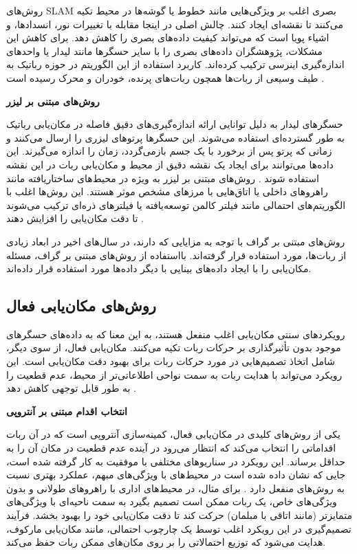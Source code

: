 روش‌های SLAM بصری اغلب بر ویژگی‌هایی مانند خطوط یا گوشه‌ها در محیط تکیه می‌کنند تا نقشه‌ای ایجاد کنند. چالش اصلی در اینجا مقابله با تغییرات نور، انسدادها، و اشیاء پویا است که می‌تواند کیفیت داده‌های بصری را کاهش دهد. برای کاهش این مشکلات، پژوهشگران داده‌های بصری را با سایر حسگرها مانند لیدار یا واحدهای اندازه‌گیری اینرسی ترکیب کرده‌اند. کاربرد استفاده از این الگوریتم در حوزه رباتیک به طیف وسیعی از ربات‌ها همچون ربات‌های پرنده، خودران و محرک رسیده است
\cite{guan2021robot, khairuddin2015review, choset2001topological}.

\textbf{روش‌های مبتنی بر لیزر}

حسگرهای لیدار به دلیل توانایی ارائه اندازه‌گیری‌های دقیق فاصله در مکان‌یابی رباتیک به طور گسترده‌ای استفاده می‌شوند. این حسگرها پرتوهای لیزری را ارسال می‌کنند و زمانی که پرتو پس از برخورد با یک جسم بازمی‌گردد، زمان را اندازه می‌گیرند. این داده‌ها می‌توانند برای ایجاد یک نقشه دقیق از محیط و مکان‌یابی ربات در این نقشه استفاده شوند
 \cite{xu2019indoor}. 
روش‌های مبتنی بر لیزر به ویژه در محیط‌های ساختاریافته مانند راهروهای داخلی یا اتاق‌هایی با مرزهای مشخص موثر هستند. این روش‌ها اغلب با الگوریتم‌های احتمالی مانند فیلتر کالمن توسعه‌یافته یا فیلترهای ذره‌ای ترکیب می‌شوند تا دقت مکان‌یابی را افزایش دهند
 \cite{liu2022improved, blok2019robot}.
 
 روش‌های مبتنی بر گراف با توجه به مزایایی که دارند، در سال‌های اخیر در ابعاد زیادی از ربات‌ها، مورد استفاده قرار گرفته‌اند. 
 \cite{yang2022indoor, song2021tightly, li2015gaussian, dai2022uav} بااستفاده از روش‌های مبتنی بر گراف، مسئله مکان‌یابی را با ایجاد داده‌های بینایی با دیگر داده‌ها مورد استفاده قرار داده‌اند.

\subsection{روش‌های مکان‌یابی فعال}

رویکردهای سنتی مکان‌یابی اغلب منفعل هستند، به این معنا که به داده‌های حسگرهای موجود بدون تأثیرگذاری بر حرکات ربات تکیه می‌کنند. مکان‌یابی فعال، از سوی دیگر، شامل اتخاذ تصمیم‌هایی در مورد حرکات ربات برای بهبود دقت مکان‌یابی است. این رویکرد می‌تواند با هدایت ربات به سمت نواحی اطلاعاتی‌تر از محیط، عدم قطعیت را به طور قابل توجهی کاهش دهد
\cite{burgard1997active}.

\textbf{انتخاب اقدام مبتنی بر آنتروپی}

یکی از روش‌های کلیدی در مکان‌یابی فعال، کمینه‌سازی آنتروپی است که در آن ربات اقداماتی را انتخاب می‌کند که انتظار می‌رود در آینده عدم قطعیت در مکان آن را به حداقل برساند. این رویکرد در سناریوهای مختلفی با موفقیت به کار گرفته شده است، جایی که نشان داده شده است در محیط‌های با ویژگی‌های مبهم، عملکرد بهتری نسبت به روش‌های منفعل دارد
\cite{burgard1997active2}.
برای مثال، در محیط‌های اداری با راهروهای طولانی و بدون ویژگی‌های خاص، یک ربات ممکن است تصمیم بگیرد به سمت ناحیه‌ای با ویژگی‌های متمایزتر (مانند اتاقی با مبلمان) حرکت کند تا دقت مکان‌یابی خود را بهبود بخشد. فرآیند تصمیم‌گیری در این رویکرد اغلب توسط یک چارچوب احتمالی، مانند مکان‌یابی مارکوف، هدایت می‌شود که توزیع احتمالاتی را بر روی مکان‌های ممکن ربات حفظ می‌کند.


